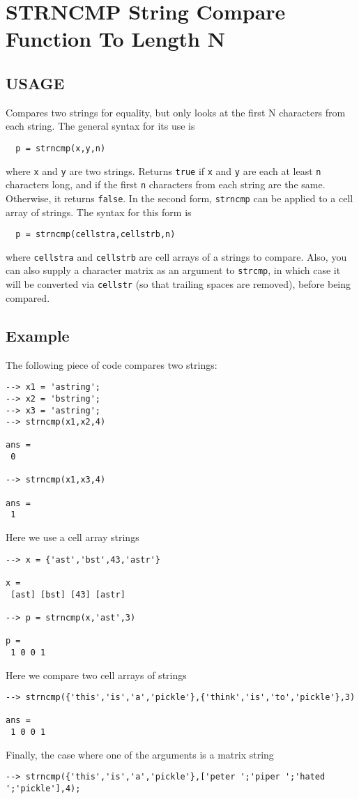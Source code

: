 \section{STRNCMP String Compare Function To Length N }

\subsection{USAGE}

Compares two strings for equality, but only looks at the
first N characters from each string.  The general syntax 
for its use is
\begin{verbatim}
  p = strncmp(x,y,n)
\end{verbatim}
where \verb|x| and \verb|y| are two strings.  Returns \verb|true| if \verb|x|
and \verb|y| are each at least \verb|n| characters long, and if the
first \verb|n| characters from each string are the same.  Otherwise,
it returns \verb|false|.
In the second form, \verb|strncmp| can be applied to a cell array of
strings.  The syntax for this form is
\begin{verbatim}
  p = strncmp(cellstra,cellstrb,n)
\end{verbatim}
where \verb|cellstra| and \verb|cellstrb| are cell arrays of a strings
to compare.  Also, you can also supply a character matrix as
an argument to \verb|strcmp|, in which case it will be converted
via \verb|cellstr| (so that trailing spaces are removed), before being
compared.
\subsection{Example}

The following piece of code compares two strings:
\begin{verbatim}
--> x1 = 'astring';
--> x2 = 'bstring';
--> x3 = 'astring';
--> strncmp(x1,x2,4)

ans = 
 0 

--> strncmp(x1,x3,4)

ans = 
 1 
\end{verbatim}
Here we use a cell array strings
\begin{verbatim}
--> x = {'ast','bst',43,'astr'}

x = 
 [ast] [bst] [43] [astr] 

--> p = strncmp(x,'ast',3)

p = 
 1 0 0 1 
\end{verbatim}
Here we compare two cell arrays of strings
\begin{verbatim}
--> strncmp({'this','is','a','pickle'},{'think','is','to','pickle'},3)

ans = 
 1 0 0 1 
\end{verbatim}
Finally, the case where one of the arguments is a matrix
string
\begin{verbatim}
--> strncmp({'this','is','a','pickle'},['peter ';'piper ';'hated ';'pickle'],4);
\end{verbatim}
